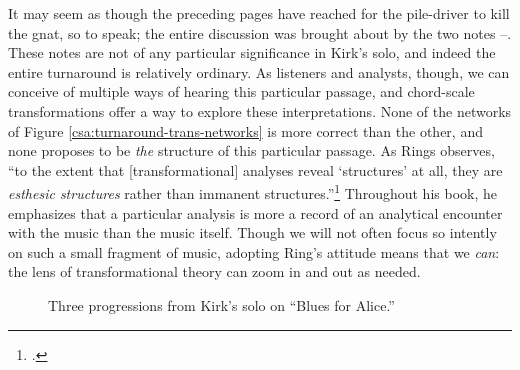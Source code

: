 It may seem as though the preceding pages have reached for the pile-driver to
kill the gnat, so to speak; the entire discussion was brought about by the two
notes \Eflat--\Dflat. These notes are not of any particular
significance in Kirk's solo, and indeed the entire turnaround is relatively
ordinary. As listeners and analysts, though, we can conceive of multiple ways
of hearing this particular passage, and chord-scale transformations
offer a way to explore these interpretations. None of the networks of Figure
\ref{csa:turnaround-trans-networks} is more correct than the other, and none
proposes to be \emph{the} structure of this particular passage. As Rings
observes, ``to the extent that [transformational] analyses reveal `structures'
at all, they are \emph{esthesic structures} rather than immanent
structures.''\footcite[37, emphasis original]{rings:2011} Throughout his book,
he emphasizes that a particular analysis is more a record of an analytical
encounter with the music than the music itself. Though we will not often focus
so intently on such a small fragment of music, adopting Ring's attitude means
that we \emph{can}: the lens of transformational theory can zoom in and out as
needed.

\begin{figure}[tbp]
  \caption{Three \tfo progressions from Kirk's solo on ``Blues for Alice.''}
  \label{csa:kirk-tfo-progs}
\end{figure}

